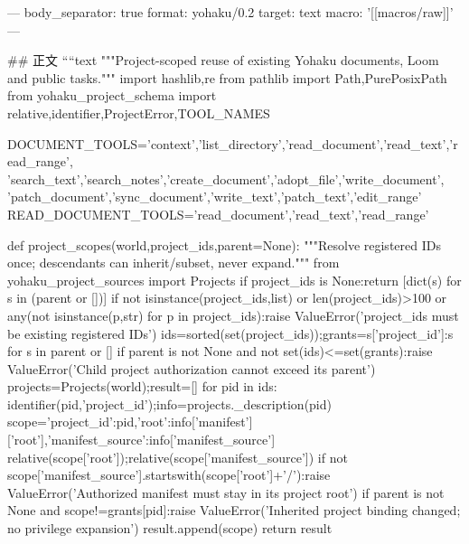 ---
body_separator: true
format: yohaku/0.2
target: text
macro: '[[macros/raw]]'
---

## 正文
````text
"""Project-scoped reuse of existing Yohaku documents, Loom and public tasks."""
import hashlib,re
from pathlib import Path,PurePosixPath
from yohaku_project_schema import relative,identifier,ProjectError,TOOL_NAMES

DOCUMENT_TOOLS={'context','list_directory','read_document','read_text','read_range',
 'search_text','search_notes','create_document','adopt_file','write_document',
 'patch_document','sync_document','write_text','patch_text','edit_range'}
READ_DOCUMENT_TOOLS={'read_document','read_text','read_range'}

def project_scopes(world,project_ids,parent=None):
 """Resolve registered IDs once; descendants can inherit/subset, never expand."""
 from yohaku_project_sources import Projects
 if project_ids is None:return [dict(s) for s in (parent or [])]
 if not isinstance(project_ids,list) or len(project_ids)>100 or any(not isinstance(p,str) for p in project_ids):raise ValueError('project_ids must be existing registered IDs')
 ids=sorted(set(project_ids));grants={s['project_id']:s for s in parent or []}
 if parent is not None and not set(ids)<=set(grants):raise ValueError('Child project authorization cannot exceed its parent')
 projects=Projects(world);result=[]
 for pid in ids:
  identifier(pid,'project_id');info=projects._description(pid)
  scope={'project_id':pid,'root':info['manifest']['root'],'manifest_source':info['manifest_source']}
  relative(scope['root']);relative(scope['manifest_source'])
  if not scope['manifest_source'].startswith(scope['root']+'/'):raise ValueError('Authorized manifest must stay in its project root')
  if parent is not None and scope!=grants[pid]:raise ValueError('Inherited project binding changed; no privilege expansion')
  result.append(scope)
 return result

